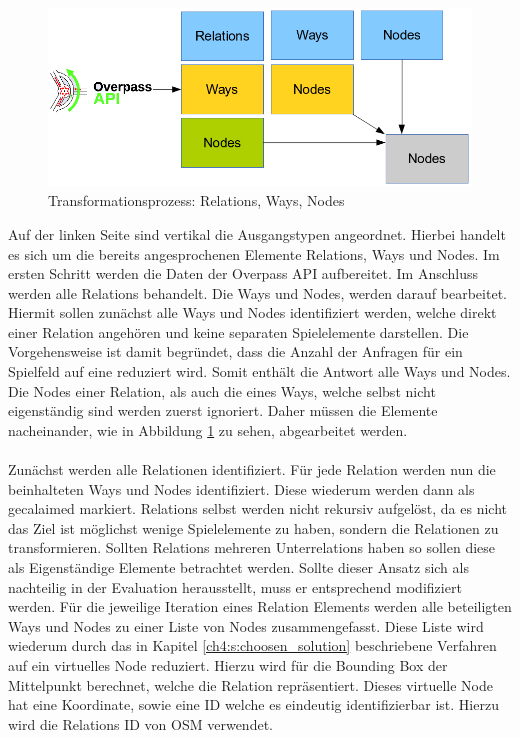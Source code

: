 \begin{figure}[H]
\begin{center}
\includegraphics[width=140mm]{images/ch5_img02_transform.png}
\caption{Transformationsprozess: Relations, Ways, Nodes}
\label{img:ch5_img02_transform}
\end{center}
\end{figure}

Auf der linken Seite sind vertikal die Ausgangstypen angeordnet. Hierbei handelt es sich um die bereits angesprochenen Elemente Relations, Ways und Nodes. Im ersten Schritt werden die Daten der Overpass API aufbereitet. Im Anschluss werden alle Relations behandelt. Die Ways und Nodes, werden darauf bearbeitet. Hiermit sollen zunächst alle Ways und Nodes identifiziert werden, welche direkt einer Relation angehören und keine separaten Spielelemente darstellen. Die Vorgehensweise ist damit begründet, dass die Anzahl der Anfragen für ein Spielfeld auf eine reduziert wird. Somit enthält die Antwort alle Ways und Nodes. Die Nodes einer Relation, als auch die eines Ways, welche selbst nicht eigenständig sind werden zuerst ignoriert. Daher müssen die Elemente nacheinander, wie in Abbildung \ref{img:ch5_img02_transform} zu sehen, abgearbeitet werden.
\\\\
Zunächst werden alle Relationen identifiziert. Für jede Relation werden nun die beinhalteten Ways und Nodes identifiziert. Diese wiederum werden dann als \glqq gecalaimed\grqq{} markiert. Relations selbst werden nicht rekursiv aufgelöst, da es nicht das Ziel ist möglichst wenige Spielelemente zu haben, sondern die Relationen zu transformieren. Sollten Relations mehreren Unterrelations haben so sollen diese als Eigenständige Elemente betrachtet werden. Sollte dieser Ansatz sich als nachteilig in der Evaluation herausstellt, muss er entsprechend modifiziert werden.
Für die jeweilige Iteration eines Relation Elements werden  alle beteiligten Ways und Nodes zu einer Liste von Nodes zusammengefasst. Diese Liste wird wiederum durch das in Kapitel \ref{ch4:s:choosen_solution} beschriebene Verfahren auf ein virtuelles Node reduziert. Hierzu wird für die Bounding Box der Mittelpunkt berechnet, welche die Relation repräsentiert. Dieses virtuelle Node hat eine Koordinate, sowie eine ID welche es eindeutig identifizierbar ist. Hierzu wird die Relations ID von OSM verwendet.

